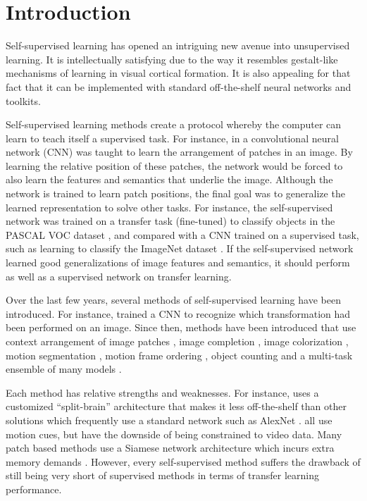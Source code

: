\documentclass[10pt,twocolumn,letterpaper]{article}
\begin{document}
\section{Introduction}

Self-supervised learning has opened an intriguing new avenue into unsupervised learning. It is intellectually satisfying due to the way it resembles gestalt-like mechanisms of learning in visual cortical formation. It is also appealing for that fact that it can be implemented with standard off-the-shelf neural networks and toolkits.

Self-supervised learning methods create a protocol whereby the computer can learn to teach itself a supervised task. For instance, in \cite{Doersch15} a convolutional neural network (CNN) was taught to learn the arrangement of patches in an image. By learning the relative position of these patches, the network would be forced to also learn the features and semantics that underlie the image. Although the network is trained to learn patch positions, the final goal was to generalize the learned representation to solve other tasks. For instance, the self-supervised network was trained on a transfer task (fine-tuned) to classify objects in the PASCAL VOC dataset \cite{Everingham10}, and compared with a CNN trained on a supervised task, such as learning to classify the ImageNet dataset \cite{Imagenet09}. If the self-supervised network learned good generalizations of image features and semantics, it should perform as well as a supervised network on transfer learning. 

Over the last few years, several methods of self-supervised learning have been introduced. For instance, \cite{Dosovitskiy15} trained a CNN to recognize which transformation had been performed on an image. Since then, methods have been introduced that use context arrangement of image patches \cite{Doersch15,Noroozi16a}, image completion \cite{Pathak16}, image colorization \cite{Zhang17,Zhang16,Larsson17}, motion segmentation \cite{Pathak17}, motion frame ordering \cite{Wang15b,Wang17,Lee17}, object counting \cite{Noroozi17} and a multi-task ensemble of many models \cite{Doersch17,Kim18}. 

Each method has relative strengths and weaknesses. For instance, \cite{Zhang17} uses a customized ``split-brain'' architecture that makes it less off-the-shelf than other solutions which frequently use a standard network such as AlexNet \cite{AlexNet}. \cite{Wang15b,Wang17,Lee17,Pathak17} all use motion cues, but have the downside of being constrained to video data.  Many patch based methods use a Siamese network architecture which incurs extra memory demands \cite{Doersch15,Noroozi16a,Noroozi17,Lee17}. However, every self-supervised method suffers the drawback of still being very short of supervised methods in terms of transfer learning performance. 
\end{document}
